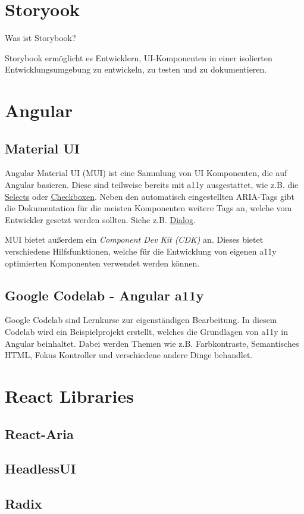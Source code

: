 \section{Storyook}

Was ist Storybook?

Storybook ermöglicht es Entwicklern, UI-Komponenten in einer isolierten Entwicklungsumgebung zu entwickeln, zu testen und zu dokumentieren. \cite{storybook_storybook_nodate}

\section{Angular}

\subsection{Material UI}

Angular Material UI (MUI) ist eine Sammlung von UI Komponenten, die auf Angular basieren. \cite{angular_components_team_angular_nodate} Diese sind teilweise bereits mit a11y ausgestattet, wie z.B. die \href{https://material.angular.io/components/select/overview#accessibility}{Selects} oder \href{https://material.angular.io/components/checkbox/overview#accessibility}{Checkboxen}. Neben den automatisch eingestellten ARIA-Tags gibt die Dokumentation für die meisten Komponenten weitere Tags an, welche vom Entwickler gesetzt werden sollten. Siehe z.B. \href{https://material.angular.io/components/dialog/overview#accessibility}{Dialog}.

MUI bietet außerdem ein \emph{Component Dev Kit (CDK)} an. Dieses bietet verschiedene Hilfsfunktionen, welche für die Entwicklung von eigenen a11y optimierten Komponenten verwendet werden können. \cite{angular_components_team_angular_nodate}

\subsection{Google Codelab - Angular a11y}

Google Codelab sind Lernkurse zur eigenständigen Bearbeitung. In diesem Codelab wird ein Beispielprojekt erstellt, welches die Grundlagen von a11y in Angular beinhaltet. Dabei werden Themen wie z.B. Farbkontraste, Semantisches HTML, Fokus Kontroller und verschiedene andere Dinge behandlet.

\section{React Libraries}

\subsection{React-Aria}

\subsection{HeadlessUI}

\subsection{Radix}
